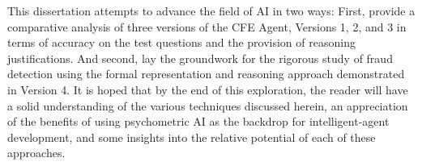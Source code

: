 This dissertation attempts to advance the field of AI in two ways:  First, provide a comparative analysis of three versions of the CFE Agent, Versions 1, 2, and 3 in terms of accuracy on the test questions and the provision of reasoning justifications.  And second, lay the groundwork for the rigorous study of fraud detection using the formal representation and reasoning approach demonstrated in Version 4.  It is hoped that by the end of this exploration, the reader will have a solid understanding of the various techniques discussed herein, an appreciation of the benefits of using psychometric AI as the backdrop for intelligent-agent development, and some insights into the relative potential of each of these approaches.